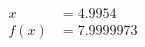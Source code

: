 \documentclass[preview]{standalone}
\begin{document}
\begin{align*}
x &= 4.9954\\f(x) &= 7.9999973
\end{align*}
\end{document}
